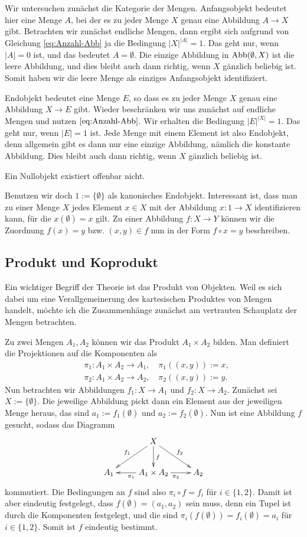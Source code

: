 \noindent
{}
Wir untersuchen zunächst die Kategorie der Mengen. Anfangsobjekt
bedeutet hier eine Menge $A$, bei der es zu jeder Menge $X$ genau
eine Abbildung $A\to X$ gibt. Betrachten wir zunächst endliche
Mengen, dann ergibt sich aufgrund von Gleichung \eqref{eq:Anzahl-Abb}
ja die Bedingung $|X|^{|A|}=1$. Das geht nur, wenn $|A|=0$ ist,
und das bedeutet $A=\emptyset$. Die einzige Abbildung in $\operatorname{Abb}(\emptyset,X)$
ist die leere Abbildung, und dies bleibt auch dann richtig, wenn
$X$ gänzlich beliebig ist. Somit haben wir die leere Menge als
einziges Anfangsobjekt identifiziert.

Endobjekt bedeutet eine Menge $E$, so dass es zu jeder Menge $X$
genau eine Abbildung $X\to E$ gibt. Wieder beschränken wir uns
zunächst auf endliche Mengen und nutzen $\eqref{eq:Anzahl-Abb}$.
Wir erhalten die Bedingung $|E|^{|X|}=1$. Das geht nur, wenn
$|E|=1$ ist. Jede Menge mit einem Element ist also Endobjekt,
denn allgemein gibt es dann nur eine einzige Abbildung, nämlich
die konstante Abbildung. Dies bleibt auch dann richtig, wenn
$X$ gänzlich beliebig ist.

Ein Nullobjekt existiert offenbar nicht.

Benutzen wir doch $1:=\{\emptyset\}$ als kanonisches Endobjekt.
Interessant ist, dass man zu einer Menge $X$ jedes Element
$x\in X$ mit der Abbildung $x\colon 1\to X$ identifizieren kann,
für die $x(\emptyset)=x$ gilt. Zu einer Abbildung $f\colon X\to Y$
können wir die Zuordnung $f(x)=y$ bzw. $(x,y)\in f$ nun in der Form
$f\circ x = y$ beschreiben.

\subsection{Produkt und Koprodukt}

Ein wichtiger Begriff der Theorie ist das Produkt von
Objekten. Weil es sich dabei um eine Verallgemeinerung des
kartesischen Produktes von Mengen handelt, möchte ich die
Zusammenhänge zunächst am vertrauten Schauplatz der Mengen
betrachten.

Zu zwei Mengen $A_1, A_2$ können wir das Produkt
$A_1\times A_2$ bilden. Man definiert die Projektionen
auf die Komponenten als
\begin{align*}
&\pi_1\colon A_1\times A_2\to A_1,\quad\pi_1((x,y)) := x,\\
&\pi_2\colon A_1\times A_2\to A_2,\quad\pi_2((x,y)) := y.
\end{align*}
Nun betrachten wir Abbildungen $f_1\colon X\to A_1$ und
$f_2\colon X\to A_2$. Zunächst sei $X:=\{\emptyset\}$. Die jeweilige
Abbildung pickt dann ein Element aus der jeweiligen Menge heraus,
das sind $a_1:=f_1(\emptyset)$ und $a_2:=f_2(\emptyset)$. Nun
ist eine Abbildung $f$ gesucht, sodass das Diagramm
\[\xymatrix{
& X\ar[dl]_{f_1}\ar[dr]^{f_2}\ar[d]^f & \\
A_1 & A_1\times A_2 \ar[l]^{\pi_1}\ar[r]_{\pi_2} & A_2
}\]
kommutiert. Die Bedingungen an $f$ sind also
$\pi_i\circ f = f_i$ für $i\in\{1,2\}$. Damit ist aber eindeutig
festgelegt, dass $f(\emptyset)=(a_1,a_2)$ sein muss, denn ein
Tupel ist durch die Komponenten festgelegt, und die sind
$\pi_i(f(\emptyset)) = f_i(\emptyset) = a_i$ für $i\in\{1,2\}$.
Somit ist $f$ eindeutig bestimmt.

